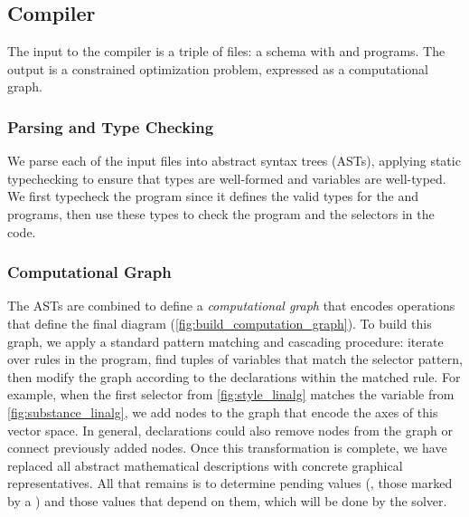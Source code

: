 
\subsection{Compiler}
\label{sec:Compiler}

The input to the compiler is a triple of files: a \Domain{} schema with \Substance{} and \Style{} programs.  The output is a constrained optimization problem, expressed as a computational graph.

\subsubsection{Parsing and Type Checking}
\label{sec:ParsingandTypeChecking}

We parse each of the input files into abstract syntax trees (ASTs), applying static typechecking to ensure that types are well-formed and variables are well-typed.  We first typecheck the \Domain{} program since it defines the valid types for the \Substance{} and \Style{} programs, then use these types to check the \Substance{} program and the selectors in the \Style{} code.

\subsubsection{Computational Graph}
\label{sec:ComputationalGraph}

The ASTs are combined to define a \emph{computational graph} that encodes operations that define the final diagram (\cref{fig:build_computation_graph}).  To build this graph, we apply a standard pattern matching and cascading procedure: iterate over rules in the \Style{} program, find tuples of \Substance{} variables that match the selector pattern, then modify the graph according to the declarations within the matched rule.  For example, when the first selector  from \cref{fig:style_linalg} matches the variable  from \cref{fig:substance_linalg}, we add nodes to the graph that encode the axes of this vector space.  In general, declarations could also remove nodes from the graph or connect previously added nodes.  Once this transformation is complete, we have replaced all abstract mathematical descriptions with concrete graphical representatives.  All that remains is to determine pending values (\ie{}, those marked by a ) and those values that depend on them, which will be done by the solver.

